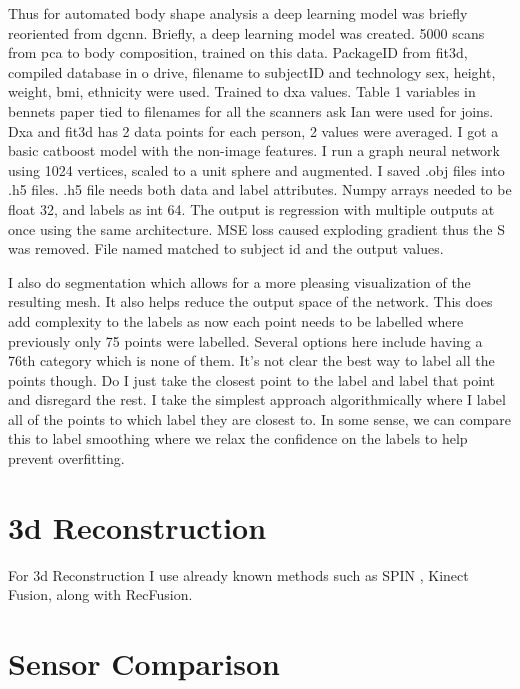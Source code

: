 Thus for automated body shape analysis a deep learning model was briefly reoriented from dgcnn. Briefly, a deep learning model was created. 5000 scans from pca to body composition, trained on this data. PackageID from fit3d, compiled database in o drive, filename to subjectID and technology sex, height, weight, bmi, ethnicity were used. Trained to dxa values. Table 1 variables in bennets paper tied to filenames for all the scanners ask Ian were used for joins. Dxa and fit3d has 2 data points for each person, 2 values were averaged. I got a basic catboost model with the non-image features. I run a graph neural network using 1024 vertices, scaled to a unit sphere and augmented. I saved .obj files into .h5 files. .h5 file needs both data and label attributes. Numpy arrays needed to be float 32, and labels as int 64. The output is regression with multiple outputs at once using the same architecture. MSE loss caused exploding gradient thus the S was removed. File named matched to subject id and the output values. 

I also do segmentation which allows for a more pleasing visualization of the resulting mesh. It also helps reduce the output space of the network. This does add complexity to the labels as now each point needs to be labelled where previously only 75 points were labelled. Several options here include having a 76th category which is none of them. It's not clear the best way to label all the points though. Do I just take the closest point to the label and label that point and disregard the rest. I take the simplest approach algorithmically where I label all of the points to which label they are closest to. In some sense, we can compare this to label smoothing where we relax the confidence on the labels to help prevent overfitting.

\section{3d Reconstruction}
For 3d Reconstruction I use already known methods such as SPIN \cite{kolotouros2019learning} , Kinect Fusion, along with RecFusion.
\section{Sensor Comparison}

